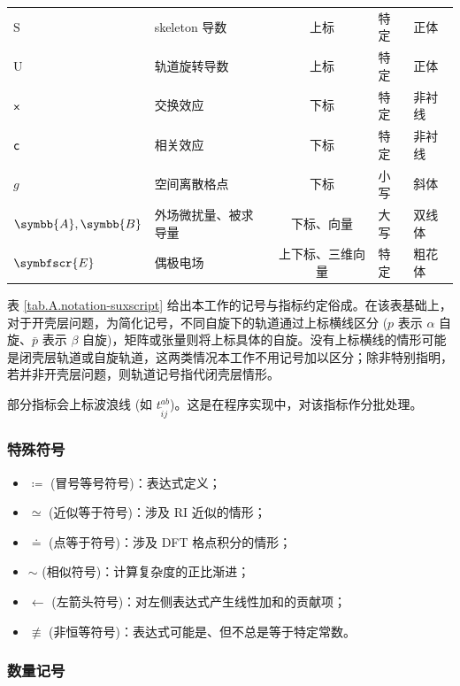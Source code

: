 \begin{table}[!ht]
{\begin{tabular}{llcll}
    $\mathrm{S}$ & skeleton 导数 & 上标 & 特定 & 正体 \\
    $\mathrm{U}$ & 轨道旋转导数 & 上标 & 特定 & 正体 \\
    $\textsf{x}$ & 交换效应 & 下标 & 特定 & 非衬线 \\
    $\textsf{c}$ & 相关效应 & 下标 & 特定 & 非衬线 \\
    $g$ & 空间离散格点 & 下标 & 小写 & 斜体 \\
    $\symbb{A}, \symbb{B}$ & 外场微扰量、被求导量 & 下标、向量 & 大写 & 双线体 \\
    $\symbfscr{E}$ & 偶极电场 & 上下标、三维向量 & 特定 & 粗花体 \\
    \bottomrule
    \end{tabular}
}{}
\end{table}

表 \ref{tab.A.notation-suxscript} 给出本工作的记号与指标约定俗成。在该表基础上，对于开壳层问题，为简化记号，不同自旋下的轨道通过上标横线区分 ($p$ 表示 $\alpha$ 自旋、$\bar p$ 表示 $\beta$ 自旋)，矩阵或张量则将上标具体的自旋。没有上标横线的情形可能是闭壳层轨道或自旋轨道，这两类情况本工作不用记号加以区分；除非特别指明，若并非开壳层问题，则轨道记号指代闭壳层情形。

部分指标会上标波浪线 (如 $t_{\tilde{i} j}^{ab}$)。这是在程序实现中，对该指标作分批处理。

\subsubsection{特殊符号}

\begin{itemize}[nosep]
    \item $\coloneq$ (冒号等号符号)：表达式定义；
    \item $\simeq$ (近似等于符号)：涉及 RI 近似的情形；
    \item $\doteq$ (点等于符号)：涉及 DFT 格点积分的情形；
    \item $\sim$ (相似符号)：计算复杂度的正比渐进；
    \item $\leftarrow$ (左箭头符号)：对左侧表达式产生线性加和的贡献项；
    \item $\not \equiv$ (非恒等符号)：表达式可能是、但不总是等于特定常数。
\end{itemize}

\subsubsection{数量记号}

